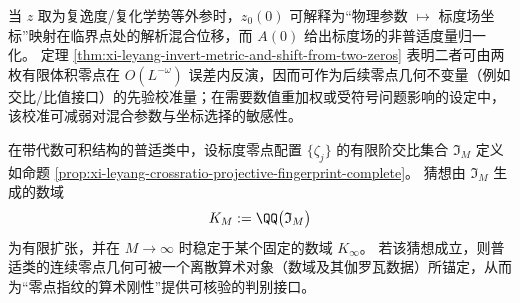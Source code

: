 \begin{remark}[混合位移与度量归一化的可观测反演接口]\label{rem:xi-leyang-twozero-calibration-interface}
当 \(z\) 取为复逸度/复化学势等外参时，\(z_0(0)\) 可解释为“物理参数 \(\mapsto\) 标度场坐标”映射在临界点处的解析混合位移，而 \(A(0)\) 给出标度场的非普适度量归一化。
定理 \ref{thm:xi-leyang-invert-metric-and-shift-from-two-zeros} 表明二者可由两枚有限体积零点在 \(O(L^{-\omega})\) 误差内反演，因而可作为后续零点几何不变量（例如交比/比值接口）的先验校准量；在需要数值重加权或受符号问题影响的设定中，该校准可减弱对混合参数与坐标选择的敏感性。
\end{remark}



\begin{conjecture}[交比常数的数域有限生成与稳定性]\label{conj:xi-leyang-crossratio-arithmetic-rigidity}
在带代数可积结构的普适类中，设标度零点配置 \(\{\zeta_j\}\) 的有限阶交比集合 \(\mathfrak{I}_M\) 定义如命题 \ref{prop:xi-leyang-crossratio-projective-fingerprint-complete}。
猜想由 \(\mathfrak{I}_M\) 生成的数域
\[
K_M:=\QQ\bigl(\mathfrak{I}_M\bigr)
\]
为有限扩张，并在 \(M\to\infty\) 时稳定于某个固定的数域 \(K_\infty\)。
若该猜想成立，则普适类的连续零点几何可被一个离散算术对象（数域及其伽罗瓦数据）所锚定，从而为“零点指纹的算术刚性”提供可核验的判别接口。
\end{conjecture}
